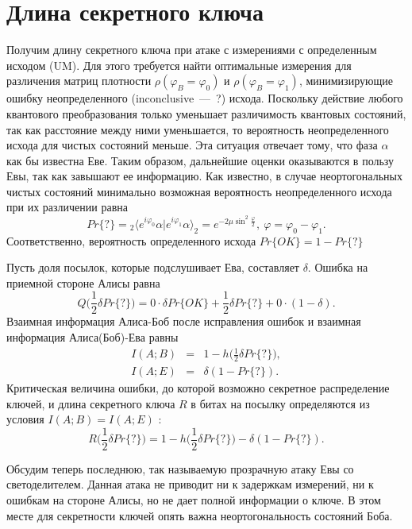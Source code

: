 \section{Длина секретного ключа}\label{sec:key_length}
Получим длину секретного ключа при атаке с измерениями с определенным исходом (UM). Для этого требуется найти оптимальные измерения для различения матриц плотности $\rho(\varphi_B = \varphi_0)$ и $\rho(\varphi_B = \varphi_1)$, минимизирующие ошибку неопределенного (inconclusive~---~?) исхода. 
Поскольку действие любого квантового преобразования только уменьшает различимость квантовых состояний, так как расстояние между ними уменьшается, то вероятность неопределенного исхода для чистых состояний меньше. Эта ситуация отвечает тому, что фаза $\alpha$ как бы известна Еве. Таким образом, дальнейшие оценки оказываются в пользу Евы, так как завышают ее информацию. 
Как известно, в случае неортогональных чистых состояний минимально возможная вероятность неопределенного исхода при их различении равна
\begin{equation*}
  Pr\{?\} = {}_2 \langle e^{i \varphi_0} \alpha | e^{i \varphi_1} \alpha \rangle_2 = e^{-2\mu\sin^2{\frac{\varphi}{2}}},~\varphi = \varphi_0 - \varphi_1.
\end{equation*}
Соответственно, вероятность определенного исхода $ Pr\{OK\} = 1 - Pr\{?\} $

Пусть доля посылок, которые подслушивает Ева, составляет $\delta$. Ошибка на приемной стороне Алисы равна
\begin{equation*}
  Q\bigg(\frac{1}{2}\delta Pr\{?\}\bigg) = 0 \cdot \delta Pr\{OK\} + \frac{1}{2}\delta Pr\{?\} + 0 \cdot (1 - \delta).
\end{equation*}
Взаимная информация Алиса-Боб после исправления ошибок и взаимная информация Алиса(Боб)-Ева равны
\begin{eqnarray*}
  I(A;B) &=& 1 - h\bigg(\frac{1}{2}\delta Pr\{?\}\bigg), \\
  I(A;E) &=& \delta(1 - Pr\{?\}).
\end{eqnarray*}
Критическая величина ошибки, до которой возможно секретное распределение ключей, и длина секретного ключа $R$ в битах на посылку определяются из условия $I(A;B) = I(A;E)$ \cite{renner2006SecQuaKeyDis}:
\begin{equation*}
  R\bigg(\frac{1}{2}\delta Pr\{?\}\bigg) = 1 - h\bigg(\frac{1}{2}\delta Pr\{?\}\bigg) - \delta(1 - Pr\{?\}).
\end{equation*}

Обсудим теперь последнюю, так называемую прозрачную атаку Евы со светоделителем. Данная атака не приводит ни к задержкам измерений, ни к ошибкам на стороне Алисы, но не дает полной информации о ключе. 
В этом месте для секретности ключей опять важна неортогональность состояний Боба.

